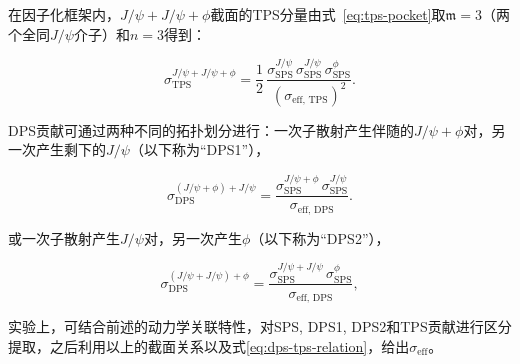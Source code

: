 在因子化框架内，$J/\psi+J/\psi+\phi$截面的TPS分量由式~\eqref{eq:tps-pocket}取$\mathfrak{m}=3$（两个全同$J/\psi$介子）和$n=3$得到：

\begin{equation}
  \label{eq:jpsijpsiphi-tps}
  \sigma_{\mathrm{TPS}}^{J/\psi+J/\psi+\phi}
  =
  \frac{1}{2}\,
  \frac{\sigma_{\mathrm{SPS}}^{J/\psi}\,\sigma_{\mathrm{SPS}}^{J/\psi}\,\sigma_{\mathrm{SPS}}^{\phi}}
       {(\sigma_{\mathrm{eff},\,\mathrm{TPS}})^2} .
\end{equation}

DPS贡献可通过两种不同的拓扑划分进行：一次子散射产生伴随的$J/\psi+\phi$对，另一次产生剩下的$J/\psi$（以下称为“DPS1”），

\begin{equation}
\label{eq:dps1-xsec}
  \sigma_{\mathrm{DPS}}^{(J/\psi+\phi)+J/\psi}
  = \frac{\sigma_{\mathrm{SPS}}^{J/\psi+\phi}\,\sigma_{\mathrm{SPS}}^{J/\psi}}
         {\sigma_{\mathrm{eff},\,\mathrm{DPS}}}.
\end{equation}

或一次子散射产生$J/\psi$对，另一次产生$\phi$（以下称为“DPS2”），

\begin{equation}
\label{eq:dps2-xsec}
  \sigma_{\mathrm{DPS}}^{(J/\psi+J/\psi)+\phi}
  = \frac{\sigma_{\mathrm{SPS}}^{J/\psi+J/\psi}\,\sigma_{\mathrm{SPS}}^{\phi}}
         {\sigma_{\mathrm{eff},\,\mathrm{DPS}}},
\end{equation}

实验上，可结合前述的动力学关联特性，对SPS, DPS1, DPS2和TPS贡献进行区分提取，之后利用以上的截面关系以及式\eqref{eq:dps-tps-relation}，给出$\sigma_\mathrm{eff}$。
